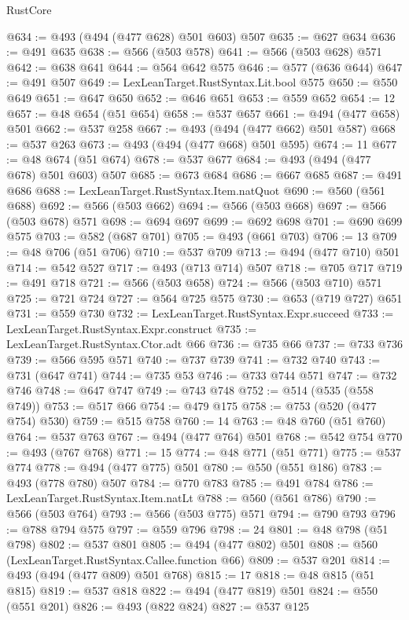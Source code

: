 \begin{lexlean}{RustCore}
\begin{coremodule}
@634 := @493 (@494 (@477 @628) @501 @603) @507
@635 := @627 @634
@636 := @491 @635
@638 := @566 (@503 @578)
@641 := @566 (@503 @628) @571
@642 := @638 @641
@644 := @564 @642 @575
@646 := @577 (@636 @644)
@647 := @491 @507
@649 := LexLeanTarget.RustSyntax.Lit.bool @575
@650 := @550 @649
@651 := @647 @650
@652 := @646 @651
@653 := @559 @652
@654 := 12
@657 := @48 @654 (@51 @654)
@658 := @537 @657
@661 := @494 (@477 @658) @501
@662 := @537 @258
@667 := @493 (@494 (@477 @662) @501 @587)
@668 := @537 @263
@673 := @493 (@494 (@477 @668) @501 @595)
@674 := 11
@677 := @48 @674 (@51 @674)
@678 := @537 @677
@684 := @493 (@494 (@477 @678) @501 @603) @507
@685 := @673 @684
@686 := @667 @685
@687 := @491 @686
@688 := LexLeanTarget.RustSyntax.Item.natQuot
@690 := @560 (@561 @688)
@692 := @566 (@503 @662)
@694 := @566 (@503 @668)
@697 := @566 (@503 @678) @571
@698 := @694 @697
@699 := @692 @698
@701 := @690 @699 @575
@703 := @582 (@687 @701)
@705 := @493 (@661 @703)
@706 := 13
@709 := @48 @706 (@51 @706)
@710 := @537 @709
@713 := @494 (@477 @710) @501
@714 := @542 @527
@717 := @493 (@713 @714) @507
@718 := @705 @717
@719 := @491 @718
@721 := @566 (@503 @658)
@724 := @566 (@503 @710) @571
@725 := @721 @724
@727 := @564 @725 @575
@730 := @653 (@719 @727) @651
@731 := @559 @730
@732 := LexLeanTarget.RustSyntax.Expr.succeed
@733 := LexLeanTarget.RustSyntax.Expr.construct
@735 := LexLeanTarget.RustSyntax.Ctor.adt @66
@736 := @735 @66
@737 := @733 @736
@739 := @566 @595 @571
@740 := @737 @739
@741 := @732 @740
@743 := @731 (@647 @741)
@744 := @735 @53
@746 := @733 @744 @571
@747 := @732 @746
@748 := @647 @747
@749 := @743 @748
@752 := @514 (@535 (@558 @749))
@753 := @517 @66
@754 := @479 @175
@758 := @753 (@520 (@477 @754) @530)
@759 := @515 @758
@760 := 14
@763 := @48 @760 (@51 @760)
@764 := @537 @763
@767 := @494 (@477 @764) @501
@768 := @542 @754
@770 := @493 (@767 @768)
@771 := 15
@774 := @48 @771 (@51 @771)
@775 := @537 @774
@778 := @494 (@477 @775) @501
@780 := @550 (@551 @186)
@783 := @493 (@778 @780) @507
@784 := @770 @783
@785 := @491 @784
@786 := LexLeanTarget.RustSyntax.Item.natLt
@788 := @560 (@561 @786)
@790 := @566 (@503 @764)
@793 := @566 (@503 @775) @571
@794 := @790 @793
@796 := @788 @794 @575
@797 := @559 @796
@798 := 24
@801 := @48 @798 (@51 @798)
@802 := @537 @801
@805 := @494 (@477 @802) @501
@808 := @560 (LexLeanTarget.RustSyntax.Callee.function @66)
@809 := @537 @201
@814 := @493 (@494 (@477 @809) @501 @768)
@815 := 17
@818 := @48 @815 (@51 @815)
@819 := @537 @818
@822 := @494 (@477 @819) @501
@824 := @550 (@551 @201)
@826 := @493 (@822 @824)
@827 := @537 @125

\end{coremodule}
\end{lexlean}
